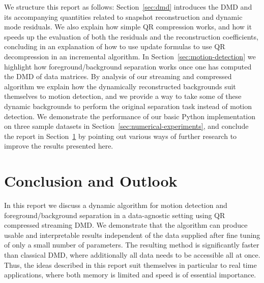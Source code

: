 \documentclass{article}
\begin{document}
    We structure this report as follows: Section~\ref{sec:dmd} introduces the DMD and its accompanying quantities related to snapshot reconstruction and dynamic mode residuals. We also explain how simple QR compression works, and how it speeds up the evaluation of both the residuals and the reconstruction coefficients, concluding in an explanation of how to use update formulas to use QR decompression in an incremental algorithm. In Section~\ref{sec:motion-detection} we highlight how foreground/background separation works once one has computed the DMD of data matrices. By analysis of our streaming and compressed algorithm we explain how the dynamically reconstructed backgrounds suit themselves to motion detection, and we provide a way to take some of these dynamic backgrounds to perform the original separation task instead of motion detection. We demonstrate the performance of our basic Python implementation on three sample datasets in Section~\ref{sec:numerical-experiments}, and conclude the report in Section~\ref{sec:conclusion} by pointing out various ways of further research to improve the results presented here.
    
    
    
    

    \section{Conclusion and Outlook}\label{sec:conclusion}

    In this report we discuss a dynamic algorithm for motion detection and foreground/background separation in a data-agnostic setting using QR compressed streaming DMD. We demonstrate that the algorithm can produce usable and interpretable results independent of the data supplied after fine tuning of only a small number of parameters. The resulting method is significantly faster than classical DMD, where additionally all data needs to be accessible all at once. Thus, the ideas described in this report suit themselves in particular to real time applications, where both memory is limited and speed is of essential importance.
\end{document}
